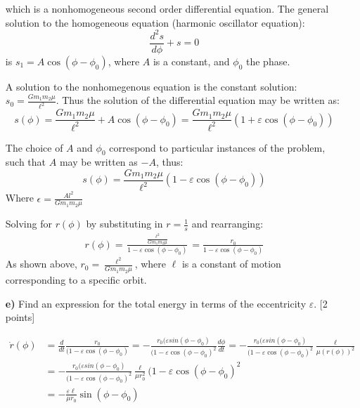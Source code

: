 \documentclass[11pt,a4paper]{report}
\newcounter{excount}[chapter]
\newenvironment{exercise}[1][]{\addtocounter{excount}{1} \noindent {\bf Question
    \arabic{excount} \ \ #1}\hspace{2mm}}{\vspace{4mm}}
\begin{document}
\begin{exercise}{\bf Orbital motion\\}
\begin{itemize}
which is a nonhomogeneous second order differential equation. 
The general solution to the homogeneous equation (harmonic oscillator equation): 
\begin{equation}
\frac{d^2s}{d\phi} + s=0
\end{equation}  is $s_1= A \cos(\phi-\phi_0)$, where $A$ is a constant, and $\phi_0$ the phase. \par 
A solution to the nonhomegenous equation is the constant solution: $s_0=\frac{Gm_1m_2\mu }{\ell^2 }$. Thus the solution  of the differential equation may be written as: 
\begin{equation}
s(\phi)=
\frac{Gm_1m_2\mu }{\ell^2 }+A \cos(\phi-\phi_0)=\frac{Gm_1m_2\mu }{\ell^2 }\left(1+\varepsilon \cos(\phi-\phi_0)\right)
\end{equation} \par 
The choice of $A$ and $\phi_0$ correspond to particular instances of the problem, such that $A$ may be written as $-A$, thus: 
\begin{equation}
s(\phi)=\frac{Gm_1m_2\mu }{\ell^2 }\left(1-\varepsilon \cos(\phi-\phi_0)\right)
\end{equation} 
Where $\epsilon=\frac{A l^2}{Gm_1m_2\mu}$ \par 
Solving for $r(\phi)$ by substituting in $r=\frac{1}{s}$ and rearranging:
\begin{align*}
r(\phi)=\frac{\frac{\ell^2 }{Gm_1m_2\mu}}{1-\varepsilon \cos(\phi-\phi_0)}=\frac{r_0}{1-\varepsilon \cos(\phi-\phi_0)}
\end{align*} 
As shown above, $r_0=\frac{\ell^2 }{Gm_1m_2\mu}$, where $\ell$ is a constant of motion corresponding to a specific orbit.

\item[{\bf e)}] Find an expression for the total energy in terms of the eccentricity $\varepsilon$. [2 points] \par 

\begin{align*}
\dot{r}(\phi)&=\frac{d}{dt}\frac{r_0}{(1-\varepsilon \cos(\phi-\phi_0)}=-\frac{r_0(\varepsilon sin(\phi-\phi_0)}{(1-\varepsilon \cos(\phi-\phi_0)^2}\frac{d\phi}{dt}=-\frac{r_0(\varepsilon sin(\phi-\phi_0)}{(1-\varepsilon \cos(\phi-\phi_0)^2}\frac{\ell}{\mu (r(\phi))^2}\\
&=-\frac{r_0(\varepsilon sin(\phi-\phi_0)}{(1-\varepsilon \cos(\phi-\phi_0)^2}\frac{\ell}{\mu r_0^2}(1-\varepsilon \cos(\phi-\phi_0)^2\\
&=-\frac{\varepsilon \ell}{\mu r_0}\sin(\phi-\phi_0)
\end{align*}


\end{itemize}
\end{exercise}
\end{document}
